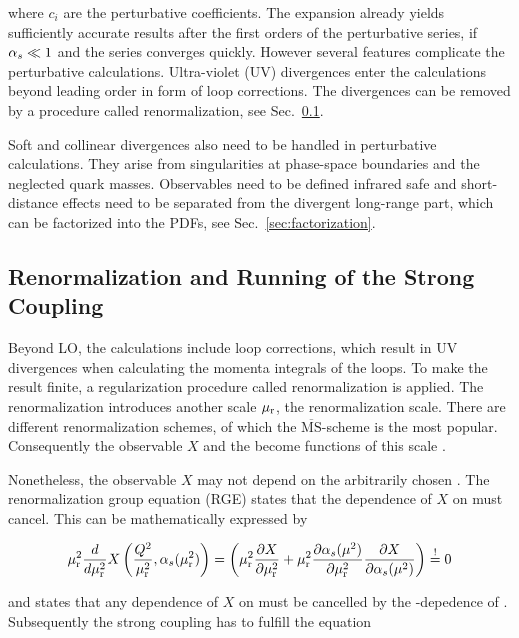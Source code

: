 where $c_i$ are the perturbative coefficients. The expansion already yields
sufficiently accurate results after the first orders of the perturbative series,
if $\alpha_{s} \ll 1$ and the series converges quickly. However several features
complicate the perturbative calculations. Ultra-violet (UV) divergences enter
the calculations beyond leading order in form of loop corrections. The
divergences can be removed by a procedure called renormalization, see
Sec.~\ref{sec:renormalization}.

Soft and collinear divergences also need to be handled in perturbative
calculations. They arise from singularities at phase-space boundaries and the
neglected quark masses. Observables need to be defined infrared safe and
short-distance effects need to be separated from the divergent long-range part,
which can be factorized into the PDFs, see Sec.~\ref{sec:factorization}.

\subsection{Renormalization and Running of the Strong Coupling}
\label{sec:renormalization}

Beyond LO, the calculations include loop corrections, which result in UV
divergences when calculating the momenta integrals of the loops. To make the
result finite, a regularization procedure called renormalization is applied. The
renormalization introduces another scale $\mu_{\mathrm{r}}$, the renormalization scale.
There are different renormalization schemes, of which the
$\overline{\mathrm{MS}}$-scheme is the most popular. Consequently the observable
$X$ and the \as become functions of this scale \mur. 

Nonetheless, the observable $X$ may not depend on the arbitrarily chosen \mur.
The renormalization group equation (RGE) states that the dependence of $X$ on
\mur must cancel. This can be mathematically expressed by

\begin{equation} 
    \mu_{\mathrm{r}}^2 \frac{d}{d \mu_{\mathrm{r}}^2} X \left(\frac{Q^2}{\mu_{\mathrm{r}}^2},\alpha_{s}(\mu_{\mathrm{r}}^2)\right) = \left(
    \mu_{\mathrm{r}}^2 \frac{\partial X}{\partial \mu_{\mathrm{r}}^2} + \mu_{\mathrm{r}}^2 \frac{\partial
    \alpha_{s}(\mu^2)}{\partial \mu_{\mathrm{r}}^2} \frac{\partial X}{\partial \alpha_{s}(\mu^2)} \right) \stackrel{!}{=} 0 
\end{equation}

and states that any dependence of $X$ on \mur must be cancelled by the
\mur-depedence of \as. Subsequently the strong coupling has to fulfill the
equation

